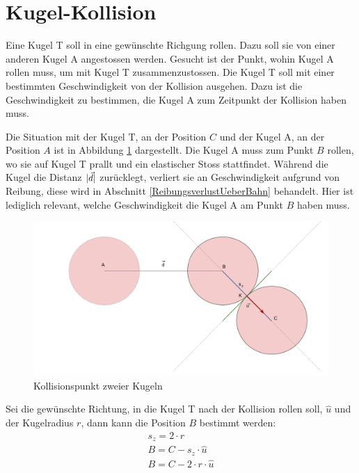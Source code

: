 \section{Kugel-Kollision}\label{anhang:herleitung:ballCollisionReverse}
Eine Kugel T soll in eine gewünschte Richgung rollen. Dazu soll sie von einer anderen Kugel A angestossen werden.
Gesucht ist der Punkt, wohin Kugel A rollen muss, um mit Kugel T zusammenzustossen.
Die Kugel T soll mit einer bestimmten Geschwindigkeit von der Kollision ausgehen.
Dazu ist die Geschwindigkeit zu bestimmen, die Kugel A  zum Zeitpunkt der Kollision haben muss.

Die Situation mit der Kugel T, an der Position $C$ und der Kugel A, an der Position $A$ ist in Abbildung \ref{fig:ballCollisionPointReverse}
dargestellt. Die Kugel A muss zum Punkt $B$ rollen, wo sie auf Kugel T prallt und ein elastischer Stoss\cite{wiki.elastischer_stoss_physik:1} stattfindet.
Während die Kugel die Distanz $\lvert \vec{d} \rvert$ zurücklegt, verliert sie an Geschwindigkeit aufgrund von Reibung,
diese wird in Abschnitt \ref{ReibungsverlustUeberBahn} behandelt. Hier ist lediglich relevant, welche Geschwindigkeit
die Kugel A am Punkt $B$ haben muss.

\begin{figure}[h!]
    \begin{center}
        \includegraphics[width=0.6\linewidth]{../common/03_billiard_ai/resources/21_kollisionspunkt_rueckwaerts.png}
    \end{center}
    \caption{Kollisionspunkt zweier Kugeln}
    \label{fig:ballCollisionPointReverse}
\end{figure}

Sei die gewünschte Richtung, in die Kugel T nach der Kollision rollen soll, $\hat{u}$ und der Kugelradius $r$, dann kann die Position $B$ bestimmt werden:
\begin{align}
    s_z = 2 \cdot r\\
    B = C - s_z \cdot \hat{u}\\
    B = C - 2 \cdot r \cdot \hat{u}
\end{align}

